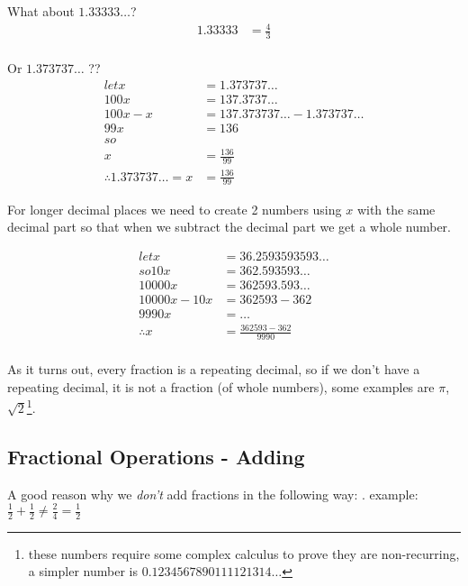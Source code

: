 What about $1.33333\ldots$?
\begin{align}
  1.33333 & = \frac{4}{3} \\
\end{align}

Or $1.373737\ldots$ ??
\begin{align}
  let     x & = 1.373737\ldots\\
       100x & = 137.3737\ldots\\
   100x - x & = 137.373737\ldots - 1.373737\ldots\\
        99x & = 136 \\
  so \nonumber \\
        x & = \frac{136}{99} \\
        \therefore 1.373737\ldots = x & = \frac{136}{99}  
\end{align}

For longer decimal places we need to create 2 numbers using $x$ with the same
decimal part so that when we subtract the decimal part we get a whole number.

\begin{align}
         let  x & = 36.2593593593\ldots \\
       so 10x & = 362.593593\ldots \\
       10000x & = 362593.593\ldots \\
   10000x-10x & = 362593-362 \\
        9990x & = \ldots \\
 \therefore x & = \frac{362593 - 362}{9990} \\
\end{align}

As it turns out, every fraction is a repeating decimal, so if we don't have a
repeating decimal, it is not a fraction (of whole numbers), some examples are
$\pi$, $\sqrt{2}$\footnote{these numbers require some complex calculus to prove
they are non-recurring, a simpler number is $0.1234567890111121314\ldots$}.

\newpage
\subsection{Fractional Operations - Adding}
\label{sec:FractionalOperationsAdding}
A good reason why we \emph{don't} add fractions in the following way:
.
example: $\frac{1}{2} + \frac{1}{2} \neq \frac{2}{4} = \frac{1}{2}$

